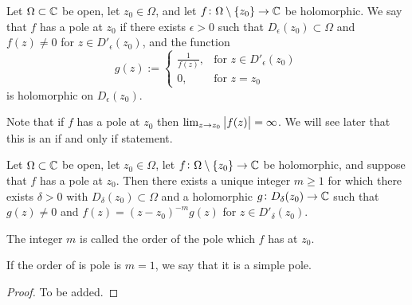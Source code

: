 \documentclass[11pt,a4paper]{article}
\begin{document}
\begin{definition}[Pole]
  Let $\Omega \subset \mathbb{C}$ be open,
  let $z_0 \in \Omega$,
  and let $f \colon \Omega \setminus \left\{z_0\right\} \to \mathbb{C}$ be holomorphic.
  We say that $f$ has a pole at $z_0$ if there exists $\epsilon > 0$
  such that $D_{\epsilon}(z_0) \subset \Omega$ and $f(z) \neq 0$ for
  $z \in D'_{\epsilon}(z_0)$, and the function
  \[
    g(z) :=
    \begin{cases}
      \frac{1}{f(z)}, &\text{for } z \in D'_{\epsilon}(z_0) \\
      0, &\text{for } z = z_0
    \end{cases}
  \]
  is holomorphic on $D_{\epsilon}(z_0)$.
\end{definition}
\begin{remark}
  Note that if $f$ has a pole at $z_0$ then
  $\lim_{z \to z_0} \left\lvert f(z)\right\rvert = \infty$.
  We will see later that this is an if and only if statement.
\end{remark}

\begin{proposition}
  \label{prop:order-of-the-pole}
  Let $\Omega \subset \mathbb{C}$ be open,
  let $z_0 \in \Omega$,
  let $f \colon \Omega \setminus \left\{z_0\right\} \to \mathbb{C}$ be holomorphic,
  and suppose that $f$ has a pole at $z_0$.
  Then there exists a unique integer $m \geq 1$ for which there exists
  $\delta > 0$ with $D_{\delta}(z_0) \subset \Omega$ and a holomorphic
  $g \colon D_{\delta}(z_0) \to \mathbb{C}$ such that $g(z) \neq 0$ and
  $f(z) = (z - z_0)^{-m} g(z)$ for $z \in D'_{\delta}(z_0)$.
\end{proposition}
\begin{remark}
  The integer $m$ is called the order of the pole which $f$ has at $z_0$.
\end{remark}
\begin{remark}
  If the order of is pole is $m = 1$, we say that it is a simple pole.
\end{remark}
\begin{proof}
  To be added.
\end{proof}
\end{document}
